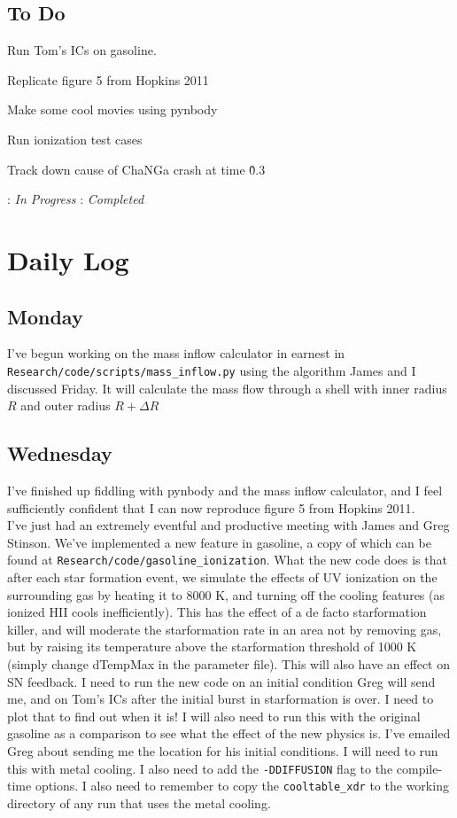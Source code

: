 \documentclass[11pt,letterpaper]{article}
\begin{document}
\subsection*{To Do}
\begin{bullets}
\item[\checkmark] Run Tom's ICs on gasoline.
\item[\textleaf] Replicate figure 5 from Hopkins 2011
\item[\checkmark] Make some cool movies using pynbody
\item[\textleaf] Run ionization test cases
\item Track down cause of ChaNGa crash at time \~0.3
\end{bullets}

\textleaf : \textit{In Progress} \qquad \checkmark : \textit{Completed}

\section*{Daily Log}
\subsection*{Monday}
I've begun working on the mass inflow calculator in earnest in 
\verb!Research/code/scripts/mass_inflow.py! using the algorithm James and I
discussed Friday.  It will calculate the mass flow through a shell with inner
radius $R$ and outer radius $R+\Delta R$
\subsection*{Wednesday}
I've finished up fiddling with pynbody and the mass inflow calculator, and I
feel sufficiently confident that I can now reproduce figure 5 from Hopkins
2011.
\\
I've just had an extremely eventful and productive meeting with James and Greg
Stinson.  We've implemented a new feature in gasoline, a copy of which can be
found at \verb!Research/code/gasoline_ionization!.  What the new code does is
that after each star formation event, we simulate the effects of UV ionization
on the surrounding gas by heating it to 8000 K, and turning off the cooling
features (as ionized HII cools inefficiently).  This has the effect of 
a de facto starformation killer, and will moderate the starformation rate in an
area not by removing gas, but by raising its temperature above the starformation
threshold of 1000 K (simply change dTempMax in the parameter file).  
This will also have an effect on SN feedback.  I need to
run the new code on an initial condition Greg will send me, and on Tom's ICs 
after the initial burst in starformation is over.  I need to plot that to find
out when it is!  I will also need to run this with the original gasoline as a 
comparison to see what the effect of the new physics is.  I've emailed Greg
about sending me the location for his initial conditions.  I will need to run
this with metal cooling.  I also need to add the \verb!-DDIFFUSION! flag to
the compile-time options.  I also need to remember to copy the 
\verb!cooltable_xdr! to the working directory of any run that uses the metal
cooling.
\end{document}
